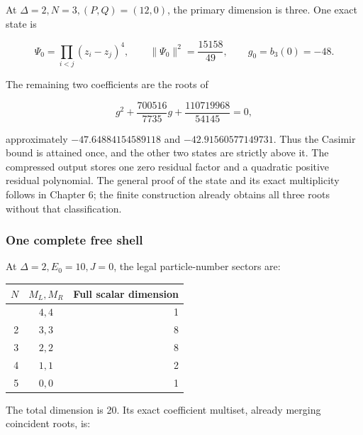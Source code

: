 \documentclass[a4paper,11pt]{article}
\numberwithin{equation}{section}
\begin{document}
At \(\Delta=2,N=3,(P,Q)=(12,0)\), the primary dimension is three. One exact state is

\[
\Psi_0=\prod_{i<j}(z_i-z_j)^4,\qquad
\|\Psi_0\|^2=\frac{15158}{49},\qquad g_0=b_3(0)=-48.
\tag{5.31}
\]

The remaining two coefficients are the roots of

\[
g^2+\frac{700516}{7735}g+\frac{110719968}{54145}=0,
\tag{5.32}
\]

approximately \(-47.64884154589118\) and \(-42.91560577149731\). Thus the Casimir bound is attained once, and the other two states are strictly above it. The compressed output stores one zero residual factor and a quadratic positive residual polynomial. The general proof of the state and its exact multiplicity follows in Chapter 6; the finite construction already obtains all three roots without that classification.

\hypertarget{one-complete-free-shell}{%
\subsubsection{One complete free shell}\label{one-complete-free-shell}}

At \(\Delta=2,E_0=10,J=0\), the legal particle-number sectors are:

\begin{longtable}[]{@{}rcr@{}}
\toprule\noalign{}
\(N\) & \(M_L,M_R\) & Full scalar dimension \\
\midrule\noalign{}
\endhead
\bottomrule\noalign{}
\endlastfoot
1 & \(4,4\) & 1 \\
2 & \(3,3\) & 8 \\
3 & \(2,2\) & 8 \\
4 & \(1,1\) & 2 \\
5 & \(0,0\) & 1 \\
\end{longtable}

The total dimension is 20. Its exact coefficient multiset, already merging coincident roots, is:
\end{document}
